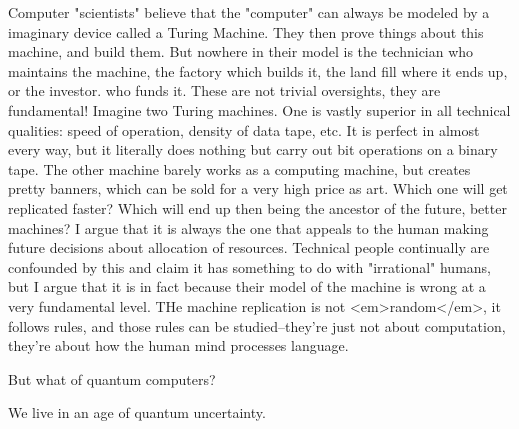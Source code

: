 \documentclass[11pt]{article}
\begin{document}
    Computer "scientists" believe that the "computer" can always be modeled by a imaginary device called a Turing Machine.  They then prove things about this machine, and build them. But nowhere in their model is the technician who maintains the machine, the factory which builds it, the land fill where it ends up, or the investor. who funds it.  These are not trivial oversights, they are fundamental!  Imagine two Turing machines.  One is vastly superior in all technical qualities: speed of operation, density of data tape, etc.  It is perfect in almost every way, but it literally does nothing but carry out bit operations on a binary tape.  The other machine barely works as a computing machine, but creates pretty banners, which can be sold for a very high price as art. Which one will get replicated faster?  Which will end up then being the ancestor of the future, better machines?  I argue that it is always the one that appeals to the human making future decisions about allocation of resources.  Technical people continually are confounded by this and claim it has something to do with "irrational" humans, but I argue that it is in fact because their model of the machine is wrong at a very fundamental level.  THe machine replication is not <em>random</em>, it follows rules, and those rules can be studied--they're just not about computation, they're about how the human mind processes language.  




    But what of quantum computers?  



We live in an age of quantum uncertainty.
\end{document}
